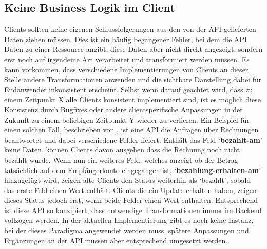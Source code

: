 \subsection{Keine Business Logik im Client}\label{subsec:api_client_no_business_logic}
Clients sollten keine eigenen Schlussfolgerungen aus den von der API gelieferten Daten ziehen müssen. Dies ist ein häufig begangener Fehler, bei dem die API Daten zu einer Ressource angibt, diese Daten aber nicht direkt angezeigt, sondern erst noch auf irgendeine Art verarbeitet und transformiert werden müssen. Es kann vorkommen, dass verschiedene Implementierungen von Clients an dieser Stelle andere Transformationen anwenden und die sichtbare Darstellung dabei für Endanwender inkonsistent erscheint. Selbst wenn darauf geachtet wird, dass zu einem Zeitpunkt X alle Clients konsistent implementiert sind, ist es möglich diese Konsistenz durch Bugfixes oder andere clientspezifische Anpassungen in der Zukunft zu einem beliebigen Zeitpunkt Y wieder zu verlieren. Ein Beispiel für einen solchen Fall, beschrieben von  \parencite[vgl.][]{sturgeon_2017}, ist eine API die Anfragen über Rechnungen beantwortet und dabei verschiedene Felder liefert. Enthält das Feld `\textbf{bezahlt-am}' keine Daten, können Clients davon ausgehen dass die Rechnung noch nicht bezahlt wurde. Wenn nun ein weiteres Feld, welches anzeigt ob der Betrag tatsächlich auf dem Empfängerkonto eingegangen ist, `\textbf{bezahlung-erhalten-am}' hinzugefügt wird, zeigen alte Clients den Status weiterhin als `bezahlt', sobald das erste Feld einen Wert enthält. Clients die ein Update erhalten haben, zeigen dieses Status jedoch erst, wenn beide Felder einen Wert enthalten.
Entsprechend ist diese API so konzipiert, dass notwendige Transformationen immer im Backend vollzogen werden. In der aktuellen Implementierung gibt es noch keine Instanz, bei der dieses Paradigma angewendet werden muss, spätere Anpassungen und Ergänzungen an der API müssen aber entsprechend umgesetzt werden.
